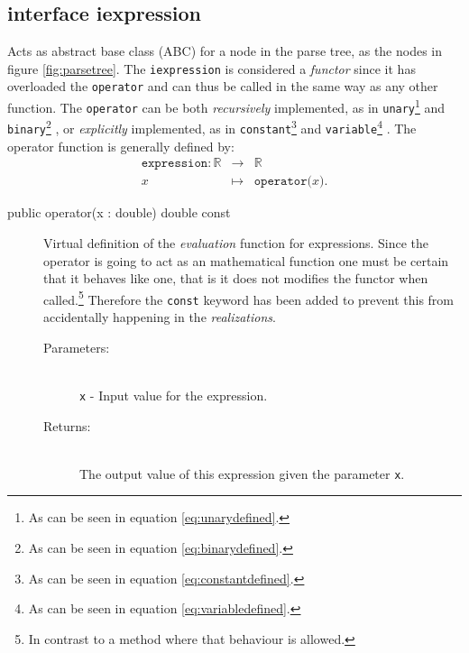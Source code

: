 \documentclass[a4paper,11pt]{kth-mag}
\newcommand{\RR}{\ensuremath{\mathbb{R}}}
\begin{document}
\subsection{interface iexpression}
\label{sec:iexpression}
Acts as abstract base class (ABC) for a node in the parse
tree, as the nodes in figure \ref{fig:parsetree}. The
\texttt{iexpression} is considered a \emph{functor} since it has overloaded the
\texttt{operator} and can thus be called in the same way as any other function.
The \texttt{operator} can be both 
\emph{recursively} implemented, as in
    \texttt{unary}\footnote{As can be seen in equation \ref{eq:unarydefined}.} 
    and
    \texttt{binary}\footnote{As can be seen in equation \ref{eq:binarydefined}.}
, or
\emph{explicitly} implemented, as in 
    \texttt{constant}\footnote{As can be seen in equation \ref{eq:constantdefined}.} 
    and
    \texttt{variable}\footnote{As can be seen in equation \ref{eq:variabledefined}.}
.
The operator function is generally defined by:
\begin{eqnarray}
    \label{eq:expressiondefined}
    \texttt{expression}: \RR &\rightarrow& \RR \nonumber \\
    x &\mapsto& \texttt{operator(}x\texttt{)} .
\end{eqnarray}

\begin{description}
    \item[public operator(x : double) double const] 
    Virtual definition of the \emph{evaluation} function for expressions. 
    Since the operator is going to act as an mathematical function one must be certain
    that it behaves like one, that is it does not modifies the functor when
    called.\footnote{In contrast to a method where that behaviour is allowed.}
    Therefore the \texttt{const} keyword has been added to prevent this
    from accidentally happening in the \emph{realizations}.
    \begin{description}
        \item[Parameters:]~\\
            \verb+x+ - Input value for the expression. 
        \item[Returns:]~\\
            The output value of this expression given the parameter \texttt{x}.
    \end{description}
\end{description}
\end{document}
